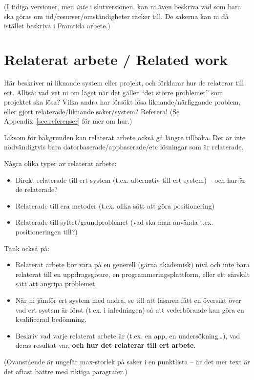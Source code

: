 \documentclass[a4paper,12pt]{article}
\begin{document}
(I tidiga versioner, men \emph{inte} i slutversionen, kan ni även beskriva vad som bara ska göras om tid/resurser/omständigheter räcker till. De sakerna kan ni då istället beskriva i Framtida arbete.)

\section{Relaterat arbete / Related work}
Här beskriver ni liknande system eller projekt, och förklarar hur de relaterar till ert.  Alltså: vad vet ni om läget när det gäller ``det större problemet'' som projektet ska lösa?  Vilka andra har försökt lösa liknande/närliggande problem, eller gjort relaterade/liknande saker/system? Referera! (Se Appendix~\ref{sec:referenser} för mer om hur.)

Liksom för bakgrunden kan relaterat arbete också gå längre tillbaka. Det är inte nödvändigtvis bara datorbaserade/appbaserade/etc lösningar som är relaterade.

Några olika typer av relaterat arbete:
\begin{itemize}
\item Direkt relaterade till ert system (t.ex. alternativ till ert system) – och hur är de relaterade?
\item Relaterade till era metoder (t.ex. olika sätt att göra positionering)
\item Relaterade till syftet/grundproblemet (vad ska man använda t.ex. positioneringen till?)
\end{itemize}

Tänk också på:

\begin{itemize}
\item 
  Relaterat arbete bör vara på en generell (gärna akademisk) nivå och inte bara relaterat till en uppdragsgivare, en programmeringsplattform, eller ett särskilt sätt att angripa problemet.
\item 
  När ni jämför ert system med andra, se till att läsaren fått en översikt över vad ert system är först (t.ex. i inledningen) så att vederbörande kan göra en kvalificerad bedömning.
\item
 Beskriv vad varje relaterat arbete är (t.ex. en app, en undersökning\ldots), vad deras resultat var, \textbf{och hur det relaterar till ert arbete}.
\end{itemize}

(Ovanstående är ungefär max-storlek på saker i en punktlista -- är det mer text är det oftast bättre med riktiga paragrafer.)
\end{document}
